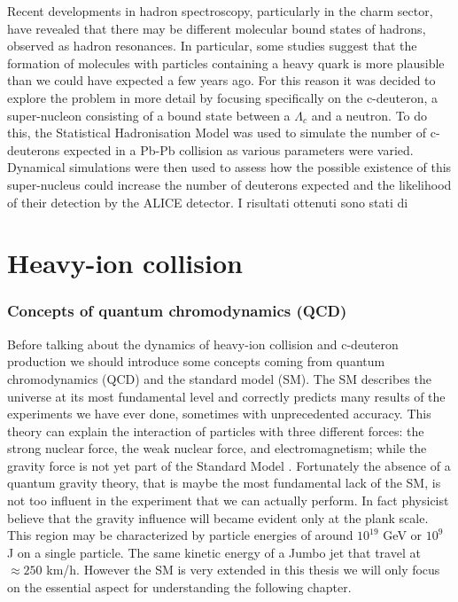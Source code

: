 \documentclass[12pt,a4paper]{book}
\begin{document}
	Recent developments in hadron spectroscopy, particularly in the charm sector, have revealed that there may be different molecular bound states of hadrons, observed as hadron resonances. In particular, some studies suggest that the formation of molecules with particles containing a heavy quark is more plausible than we could have expected a few years ago. 
	For this reason it was decided to explore the problem in more detail by focusing specifically on the c-deuteron, a super-nucleon consisting of a bound state between a $\Lambda_c$ and a neutron. To do this, the Statistical Hadronisation Model was used to simulate the number of c-deuterons expected in a Pb-Pb collision as various parameters were varied. Dynamical simulations were then used to assess how the possible existence of this super-nucleus could increase the number of deuterons expected and the likelihood of their detection by the ALICE detector. I risultati ottenuti sono stati di
	
	\chapter{Heavy-ion collision}
	\subsection{Concepts of quantum chromodynamics (QCD)}
	Before talking about the dynamics of heavy-ion collision and c-deuteron production we should introduce some concepts coming from quantum chromodynamics (QCD) and the standard model (SM). The SM describes the universe at its most fundamental level and correctly predicts many results of the experiments we have ever done, sometimes with unprecedented accuracy. This theory can explain the interaction of particles with three different forces: the strong nuclear force, the weak nuclear force, and electromagnetism; while the gravity force is not yet part of the Standard Model \cite{quevedo2024cambridgelecturesstandardmodel}. Fortunately the absence of a quantum gravity theory, that is maybe the most fundamental lack of the SM, is not too influent in the experiment that we can actually perform. In fact physicist believe that the gravity influence will became evident only at the plank scale. This region may be characterized by particle energies of around $10^{19}$ GeV or $10^9$ J on a single particle. The same kinetic energy of a Jumbo jet that travel at $\approx 250$ km/h. However the SM is very extended in this thesis we will only focus on the essential aspect for understanding the following chapter.
	
\end{document}
